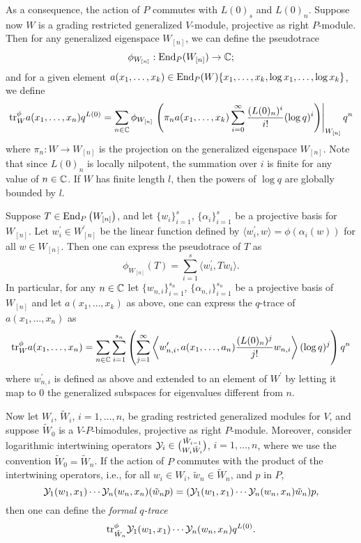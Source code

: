 \documentclass[12pt]{article}
\begin{document}
\noindent As a consequence, the action of $P$ commutes with $L(0)_s$ and $L(0)_n$.
Suppose now $W$ is a grading restricted generalized $V$-module,
projective as right $P$-module. Then for any generalized
eigenspace $W_{[n]}$, we can define the pseudotrace 
$$
  \phi_{W_{[n]}} : \mathrm{End}_P(W_{[n]}) \rightarrow \mathbb{C};
$$
and for a given element
$a(x_1,\ldots,x_k) \in \mathrm{End}_P(W)\{x_1,\ldots,x_k, \log x_1,\ldots, \log x_k\}$,
we define
$$
  \mbox{\rm tr}^\phi_W a(x_1,\ldots,x_n)q^{L(0)} =
    \sum_{n\in \mathbb{C}} \phi_{W_{[n]}} \left.\left(\pi_n a(x_1,\ldots,x_k)
    \sum_{i=0}^\infty\frac{(L(0)_n)^i}{i!}(\log q)^i\right)\right|_{{W_{[n]}}}q^n
$$
where $\pi_n : W \rightarrow W_{[n]}$ is the projection on the generalized eigenspace
$W_{[n]}$. Note that since $L(0)_n$ is locally nilpotent, the summation over $i$ is
finite for any value of $n\in \mathbb{C}$. If $W$ has finite length $l$, then the powers
of $\log q$ are globally bounded by $l$.
\begin{rema} \label{cfremark}
  {\rm
    Suppose $T\in \mathrm{End}_P \left(W_{[n]}\right)$, and let $\{w_i\}_{i=1}^s$,
    $\{\alpha_i\}_{i=1}^s$ be a projective basis for $W_{[n]}$.
    Let $w_i^\prime \in W_{[n]}^\prime$ be the linear function defined by
    $\langle w_i^\prime, w\rangle = \phi(\alpha_i(w))$ for all $w\in W_{[n]}$.
    Then one can express the pseudotrace of $T$ as
    \begin{equation*}
      \phi_{W_{[n]}}(T) = \sum_{i=1}^s \langle w_i^\prime, T w_i\rangle.
    \end{equation*}
    In particular, for any $n\in \mathbb{C}$ let $\{w_{n,i}\}_{i=1}^{s_n}$,
    $\{\alpha_{n,i}\}_{i=1}^{s_n}$ be a projective basis of $W_{[n]}$
    and let $a(x_1,\ldots, x_k)$ as above, one can express the $q$-trace
    of $a(x_1, \ldots, x_n)$ as
    \begin{equation*}
      \mbox{\rm tr}_W^\phi a(x_1,\ldots, x_n) =
        \sum_{n\in \mathbb{C}} \sum_{i=1}^{s_n}\left( \sum_{j=1}^{\infty} 
          \left\langle w_{n,i}^\prime, a(x_1,\ldots, a_n)
            \frac{(L(0)_n)^j}{j!} w_{n,i}\right\rangle (\log q)^j \right) q^n
    \end{equation*}
    where $w_{n,i}^\prime$ is defined as above and extended to an element
    of $W^\prime$ by letting it map to $0$ the generalized subspaces for eigenvalues
    different from $n$.
  }
\end{rema}

Now let $W_i$, $\tilde W_i$, $i=1,\ldots,n$, be grading restricted generalized modules
for $V$, and suppose $\tilde W_0$ is a $V$-$P$-bimodules, projective as right
$P$-module.
Moreover, consider logarithmic intertwining operators 
$\mathcal{Y}_i \in \binom{\tilde W_{i-1}}{W_i\tilde W_i}$, $i=1,\ldots,n$, where we use the
convention $\tilde W_0 = \tilde W_n$. If the action of $P$ commutes with the
product of the intertwining operators, i.e., for all $w_i\in W_i$,
$\tilde w_n \in \tilde W_n$, and $p$ in $P$,
$$
  \mathcal{Y}_1(w_1, x_1)\cdots\mathcal{Y}_n(w_n, x_n)(\tilde w_np)
    = (\mathcal{Y}_1(w_1, x_1)\cdots\mathcal{Y}_n(w_n, x_n)\tilde w_n)p,
$$
then one can define the \emph{formal $q$-trace}
$$
  \mbox{\rm tr}^\phi_{\tilde W_n} \mathcal{Y}_1(w_1, x_1)\cdots\mathcal{Y}_n(w_n, x_n)q^{L(0)}.
$$
\end{document}
